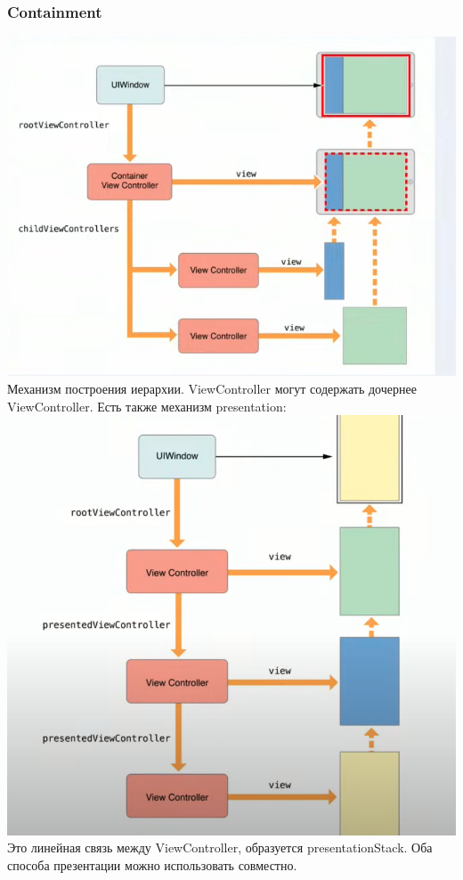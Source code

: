 \documentclass{article}
\begin{document}
    \subsubsection{Containment}
    \includegraphics[scale = 0.5]{pic/Снимок экрана 2023-08-03 в 10.53.00.png}
    \newline
    Механизм построения иерархии. ViewController могут содержать дочернее ViewController. 
    Есть также механизм presentation: 
    \newline
    \includegraphics[scale = 0.5]{pic/Снимок экрана 2023-08-03 в 10.54.12.png}
    \newline
    Это линейная связь между ViewController, образуется presentationStack. Оба способа презентации можно использовать совместно. 
\end{document}
